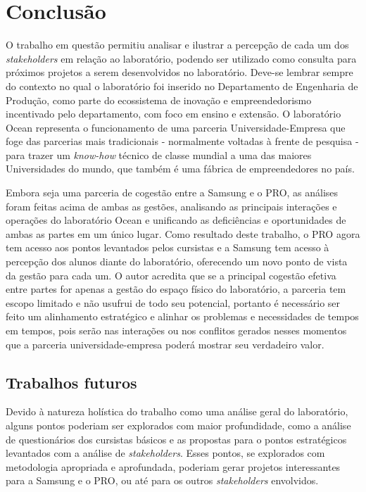 \chapter{Conclusão}
\label{cha:trabalhos_futuros}

O trabalho em questão permitiu analisar e ilustrar a percepção de cada um dos \textit{stakeholders} em relação ao laboratório, podendo ser utilizado como consulta para próximos projetos a serem desenvolvidos no laboratório. Deve-se lembrar sempre do contexto no qual o laboratório foi inserido no Departamento de Engenharia de Produção, como parte do ecossistema de inovação e empreendedorismo incentivado pelo departamento, com foco em ensino e extensão. O laboratório Ocean representa o funcionamento de uma parceria Universidade-Empresa que foge das parcerias mais tradicionais - normalmente voltadas à frente de pesquisa - para trazer um \textit{know-how} técnico de classe mundial a uma das maiores Universidades do mundo, que também é uma fábrica de empreendedores no país.

Embora seja uma parceria de cogestão entre a Samsung e o PRO, as análises foram feitas acima de ambas as gestões, analisando as principais interações e operações do laboratório Ocean e unificando as deficiências e oportunidades de ambas as partes em um único lugar. Como resultado deste trabalho, o PRO agora tem acesso aos pontos levantados pelos cursistas e a Samsung tem acesso à percepção dos alunos diante do laboratório, oferecendo um novo ponto de vista da gestão para cada um. O autor acredita que se a principal cogestão efetiva entre partes for apenas a gestão do espaço físico do laboratório, a parceria tem escopo limitado e não usufrui de todo seu potencial, portanto é necessário ser feito um alinhamento estratégico e alinhar os problemas e necessidades de tempos em tempos, pois serão nas interações ou nos conflitos gerados nesses momentos que a parceria universidade-empresa poderá mostrar seu verdadeiro valor.

\section{Trabalhos futuros} %
\label{sec:trabalhos_futuros}

Devido à natureza holística do trabalho como uma análise geral do laboratório, alguns pontos poderiam ser explorados com maior profundidade, como a análise de questionários dos cursistas básicos e as propostas para o pontos estratégicos levantados com a análise de \textit{stakeholders}. Esses pontos, se explorados com metodologia apropriada e aprofundada, poderiam gerar projetos interessantes para a Samsung e o PRO, ou até para os outros \textit{stakeholders} envolvidos.